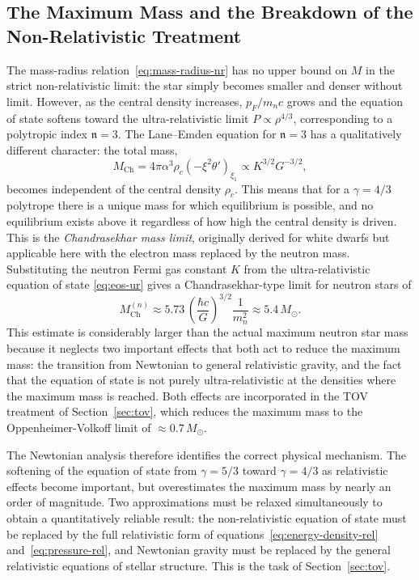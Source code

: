 \subsection{The Maximum Mass and the Breakdown of the
            Non-Relativistic Treatment}


The mass-radius relation~\eqref{eq:mass-radius-nr} has no upper bound on
$M$ in the strict non-relativistic limit: the star simply becomes
smaller and denser without limit. However, as the central density
increases, $p_F / m_n c$ grows and the equation of state softens toward
the ultra-relativistic limit $P \propto \rho^{4/3}$, corresponding to a
polytropic index $\mathfrak{n} = 3$. The Lane--Emden equation for
$\mathfrak{n} = 3$ has a qualitatively different character: the total
mass,
%
\begin{equation}
    M_{\mathrm{Ch}} = 4\pi \alpha^3 \rho_c
                      \left(-\xi^2\theta'\right)_{\xi_1}
                    \propto K^{3/2} G^{-3/2},
    \label{eq:chandrasekhar-mass}
\end{equation}
%
becomes independent of the central density $\rho_c$. This means
that for a $\gamma = 4/3$ polytrope there is a unique mass for which
equilibrium is possible, and no equilibrium exists above it regardless
of how high the central density is driven. This is the
\emph{Chandrasekhar mass limit}, originally derived for white dwarfs
\cite{Chandrasekhar1931} but applicable here with the electron mass
replaced by the neutron mass. Substituting the neutron Fermi gas
constant $K$ from the ultra-relativistic equation of state
\eqref{eq:eos-ur} gives a Chandrasekhar-type limit for neutron stars of
%
\begin{equation}
    M_{\mathrm{Ch}}^{(n)} \approx 5.73\,
    \left(\frac{\hbar c}{G}\right)^{3/2}
    \frac{1}{m_n^2}
    \approx 5.4\, M_\odot.
    \label{eq:chandrasekhar-neutron}
\end{equation}
%
This estimate is considerably larger than the actual maximum neutron star
mass because it neglects two important effects that both act to reduce
the maximum mass: the transition from Newtonian to general relativistic
gravity, and the fact that the equation of state is not purely
ultra-relativistic at the densities where the maximum mass is reached.
Both effects are incorporated in the TOV treatment of
Section~\ref{sec:tov}, which reduces the maximum mass to the
Oppenheimer-Volkoff limit of $\approx 0.7\,M_\odot$.

The Newtonian analysis therefore identifies the correct physical
mechanism. The softening of the equation of state from $\gamma = 5/3$
toward $\gamma = 4/3$ as relativistic effects become important, but
overestimates the maximum mass by nearly an order of magnitude. Two
approximations must be relaxed simultaneously to obtain a quantitatively
reliable result: the non-relativistic equation of state must be replaced
by the full relativistic form of equations~\eqref{eq:energy-density-rel}
and~\eqref{eq:pressure-rel}, and Newtonian gravity must be replaced by
the general relativistic equations of stellar structure. This is the task
of Section~\ref{sec:tov}.
